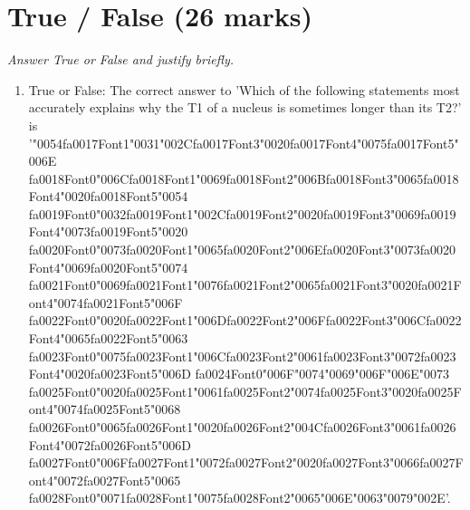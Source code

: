 \documentclass[12pt]{article}
\begin{document}
\section*{True / False (26 marks)}
\textit{Answer True or False and justify briefly.}
\begin{enumerate}[label=\arabic*.]
\item True or False: The correct answer to 'Which of the following statements most accurately explains why the T1 of a nucleus is sometimes longer than its T2?' is '{\char"0054}{\csname fa0017Font1\endcsname\char"0031}{\char"002C}{\csname fa0017Font3\endcsname\char"0020}{\csname fa0017Font4\endcsname\char"0075}{\csname fa0017Font5\endcsname\char"006E} {\csname fa0018Font0\endcsname\char"006C}{\csname fa0018Font1\endcsname\char"0069}{\csname fa0018Font2\endcsname\char"006B}{\csname fa0018Font3\endcsname\char"0065}{\csname fa0018Font4\endcsname\char"0020}{\csname fa0018Font5\endcsname\char"0054} {\csname fa0019Font0\endcsname\char"0032}{\csname fa0019Font1\endcsname\char"002C}{\csname fa0019Font2\endcsname\char"0020}{\csname fa0019Font3\endcsname\char"0069}{\csname fa0019Font4\endcsname\char"0073}{\csname fa0019Font5\endcsname\char"0020} {\csname fa0020Font0\endcsname\char"0073}{\csname fa0020Font1\endcsname\char"0065}{\csname fa0020Font2\endcsname\char"006E}{\csname fa0020Font3\endcsname\char"0073}{\csname fa0020Font4\endcsname\char"0069}{\csname fa0020Font5\endcsname\char"0074} {\csname fa0021Font0\endcsname\char"0069}{\csname fa0021Font1\endcsname\char"0076}{\csname fa0021Font2\endcsname\char"0065}{\csname fa0021Font3\endcsname\char"0020}{\csname fa0021Font4\endcsname\char"0074}{\csname fa0021Font5\endcsname\char"006F} {\csname fa0022Font0\endcsname\char"0020}{\csname fa0022Font1\endcsname\char"006D}{\csname fa0022Font2\endcsname\char"006F}{\csname fa0022Font3\endcsname\char"006C}{\csname fa0022Font4\endcsname\char"0065}{\csname fa0022Font5\endcsname\char"0063} {\csname fa0023Font0\endcsname\char"0075}{\csname fa0023Font1\endcsname\char"006C}{\csname fa0023Font2\endcsname\char"0061}{\csname fa0023Font3\endcsname\char"0072}{\csname fa0023Font4\endcsname\char"0020}{\csname fa0023Font5\endcsname\char"006D} {\csname fa0024Font0\endcsname\char"006F}{\char"0074}{\char"0069}{\char"006F}{\char"006E}{\char"0073} {\csname fa0025Font0\endcsname\char"0020}{\csname fa0025Font1\endcsname\char"0061}{\csname fa0025Font2\endcsname\char"0074}{\csname fa0025Font3\endcsname\char"0020}{\csname fa0025Font4\endcsname\char"0074}{\csname fa0025Font5\endcsname\char"0068} {\csname fa0026Font0\endcsname\char"0065}{\csname fa0026Font1\endcsname\char"0020}{\csname fa0026Font2\endcsname\char"004C}{\csname fa0026Font3\endcsname\char"0061}{\csname fa0026Font4\endcsname\char"0072}{\csname fa0026Font5\endcsname\char"006D} {\csname fa0027Font0\endcsname\char"006F}{\csname fa0027Font1\endcsname\char"0072}{\csname fa0027Font2\endcsname\char"0020}{\csname fa0027Font3\endcsname\char"0066}{\csname fa0027Font4\endcsname\char"0072}{\csname fa0027Font5\endcsname\char"0065} {\csname fa0028Font0\endcsname\char"0071}{\csname fa0028Font1\endcsname\char"0075}{\csname fa0028Font2\endcsname\char"0065}{\char"006E}{\char"0063}{\char"0079}{\char"002E}'.

\end{enumerate}
\end{document}

